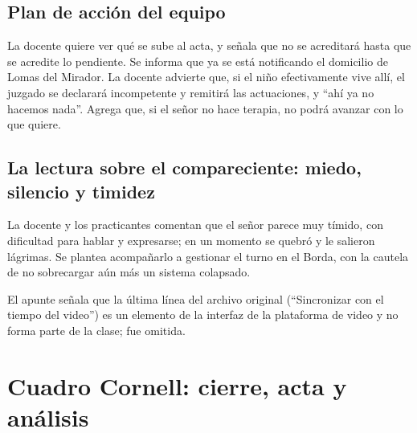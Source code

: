 \documentclass[12pt,oneside]{book}
\begin{document}
\subsection{Plan de acci\'on del equipo}

La docente quiere ver qu\'e se sube al acta, y se\~nala que no se acreditar\'a hasta que se acredite lo pendiente. Se informa que ya se est\'a notificando el domicilio de Lomas del Mirador. La docente advierte que, si el ni\~no efectivamente vive all\'i, el juzgado se declarar\'a incompetente y remitir\'a las actuaciones, y ``ah\'i ya no hacemos nada''. Agrega que, si el se\~nor no hace terapia, no podr\'a avanzar con lo que quiere.

\subsection{La lectura sobre el compareciente: miedo, silencio y timidez}

La docente y los practicantes comentan que el se\~nor parece muy t\'imido, con dificultad para hablar y expresarse; en un momento se quebr\'o y le salieron l\'agrimas. Se plantea acompa\~narlo a gestionar el turno en el Borda, con la cautela de no sobrecargar a\'un m\'as un sistema colapsado.

\begin{note}
El apunte se\~nala que la \'ultima l\'inea del archivo original (``Sincronizar con el tiempo del video'') es un elemento de la interfaz de la plataforma de video y no forma parte de la clase; fue omitida.
\end{note}

\section{Cuadro Cornell: cierre, acta y an\'alisis}
\end{document}
